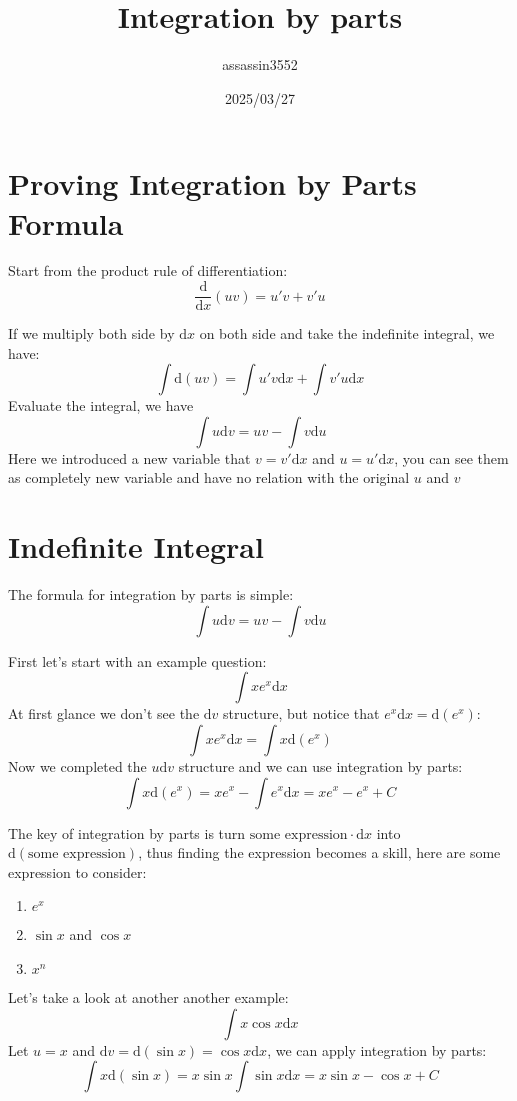 \documentclass{article}
\title{Integration by parts}
\author{assassin3552}
\date{2025/03/27}
\numberwithin{equation}{section}
\begin{document}
\maketitle
\section{Proving Integration by Parts Formula}
Start from the product rule of differentiation:
\[
\frac{\mathrm{d}}{\mathrm{d}x} (uv) = u'v + v'u
\]

If we multiply both side by $\mathrm{d}x$ on both side and take the indefinite integral, we have:
\[
\int \mathrm{d}(uv) = \int u'v \mathrm{d}x + \int v'u \mathrm{d}x
\]
Evaluate the integral, we have 
\[
\int u \mathrm{d}v = uv - \int v\mathrm{d}u
\]
Here we introduced a new variable that $v = v'\mathrm{d}x$ and $u = u'\mathrm{d}x$, you can see them as completely new variable and have no relation with the original $u$ and $v$

\newpage
\section{Indefinite Integral}
The formula for integration by parts is simple:
\[
\int u \mathrm{d}v = uv - \int v \mathrm{d}u
\]

First let's start with an example question:
\[
\int x e^x \mathrm{d}x
\]
At first glance we don't see the $\mathrm{d}v$ structure, but notice that $e^x \mathrm{d}x = \mathrm{d}(e^x)$:
\[
\int x e^x \mathrm{d}x = \int x \mathrm{d}(e^x)
\]
Now we completed the $u\mathrm{d}v$ structure and we can use integration by parts:
\[
    \int x \mathrm{d}(e^x) = x e^x - \int e^x \mathrm{d}x = x e^x - e^x + C
\]

The key of integration by parts is turn $\text{some expression}\cdot \mathrm{d}x$ into $\mathrm{d}(\text{some expression})$, 
thus finding the expression becomes a skill, here are some expression to consider:
\begin{enumerate}
    \item $e^x$
    \item $\sin x$ and $\cos x$
    \item $x^n$
\end{enumerate}

Let's take a look at another another example:
\[
\int x\cos x \mathrm{d}x
\]
Let $u = x$ and $\mathrm{d}v = \mathrm{d}(\sin x) = \cos x \mathrm{d}x$, we can apply integration by parts:
\[
\int x \mathrm{d}(\sin x) = x\sin x \int \sin x \mathrm{d}x = x \sin x - \cos x + C
\]
\end{document}
